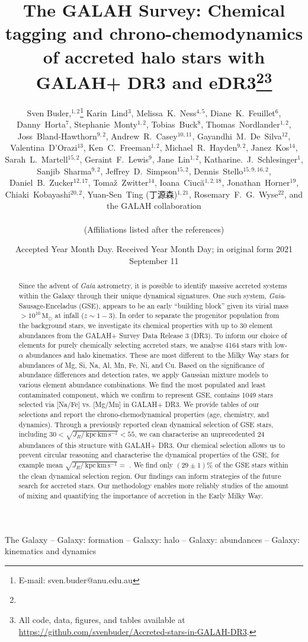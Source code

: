 \documentclass[fleqn,usenatbib]{mnras}
\title[Accreted stars in GALAH+ DR3]{The GALAH Survey: Chemical tagging and chrono-chemodynamics of accreted halo stars with GALAH+ DR3 and \Gaia eDR3\thanks{\added{GALAH+ combines observations based on the main GALAH proposals as well as K2-HERMES, TESS-HERMES, and partner proposals.}}\thanks{All code, data, figures, and tables available at \url{https://github.com/svenbuder/Accreted-stars-in-GALAH-DR3}.}}
\author[S. Buder et al.]{Sven Buder,$^{1,2}$\thanks{E-mail: sven.buder@anu.edu.au}
Karin~Lind$^{3}$, 
Melissa~K.~Ness$^{4,5}$, 
Diane~K.~Feuillet$^{6}$,
Danny~Horta$^{7}$,
Stephanie~Monty$^{1,2}$, \newauthor
Tobias~Buck$^{8}$, 
Thomas~Nordlander$^{1,2}$,
Joss~Bland-Hawthorn$^{9,2}$,
Andrew~R.~Casey$^{10,11}$,\newauthor
Gayandhi~M.~De~Silva$^{12}$,
Valentina~{D'Orazi}$^{13}$,
Ken~C.~Freeman$^{1,2}$, 
Michael~R.~Hayden$^{9,2}$,
Janez~Kos$^{14}$, \newauthor
Sarah~L.~Martell$^{15,2}$, 
Geraint~F.~Lewis$^{9}$,
Jane~Lin$^{1,2}$, 
Katharine.~J.~Schlesinger$^{1}$, 
Sanjib~Sharma$^{9,2}$, \newauthor
Jeffrey~D.~Simpson$^{15,2}$, 
Dennis~Stello$^{15,9,16,2}$,
Daniel~B.~Zucker$^{12,17}$, 
Toma\v{z}~Zwitter$^{14}$,
Ioana~Ciuc\u{a}$^{1,2,18}$,\newauthor
Jonathan~Horner$^{19}$,
Chiaki~Kobayashi$^{20,2}$,
Yuan-Sen~Ting (丁源森)$^{1,21}$,
Rosemary~F.~G.~Wyse$^{22}$, \newauthor
and the GALAH collaboration
\\
\\
(Affiliations listed after the references)}
\date{Accepted Year Month Day. Received Year Month Day; in original form 2021 September 11}
\newcommand{\added}[1]{#1}
\newcommand{\Msol}{\,\mathrm{M_\odot}} %
\newcommand{\kpckms}{\,\mathrm{kpc\,km\,s^{-1}}}	%
\newcommand{\Gaia}{\textit{Gaia}\xspace} %
\begin{document}
\begin{CJK*}{UTF8}{gbsn}
\label{firstpage}
\pagerange{\pageref{firstpage}--\pageref{lastpage}}
\maketitle
\end{CJK*}

\begin{abstract}
Since the advent of \Gaia astrometry, it is possible to identify massive accreted systems within the Galaxy through their unique dynamical signatures. One such system, \Gaia-Sausage-Enceladus (GSE), appears to be an early ``building block'' given its virial mass $> 10^{10}\Msol$ at infall ($z\sim 1-3$). In order to separate the progenitor population from the background stars, we investigate its chemical properties with up to 30 element abundances from the GALAH+ Survey Data Release 3 (DR3). To inform our choice of elements for purely chemically selecting accreted stars, we analyse 4164 stars with low-$\alpha$ abundances and halo kinematics. These are most different to the Milky Way stars for abundances of Mg, Si, Na, Al, Mn, Fe, Ni, and Cu. Based on the significance of abundance differences and detection rates, we apply Gaussian mixture models to various element abundance combinations. We find the most populated and least contaminated component, which we confirm to represent GSE, contains 1049 stars selected via [Na/Fe] vs. [Mg/Mn] in GALAH+ DR3. We provide tables of our selections and report the chrono-chemodynamical properties (age, chemistry, and dynamics). Through a previously reported clean dynamical selection of GSE stars, including $30 < \sqrt{J_R / \kpckms} < 55$, we can characterise an unprecedented 24 abundances of this structure with GALAH+ DR3. Our chemical selection allows us to prevent circular reasoning and characterise the dynamical properties of the GSE, for example mean $\sqrt{J_R / \kpckms} = $ . We find only $(29\pm1)\%$ of the GSE stars within the clean dynamical selection region. \added{Our findings can inform strategies of the future search for accreted stars. Our methodology enables more reliably studies of the amount of mixing and quantifying the importance of accretion in the Early Milky Way.} \href{https://github.com/svenbuder/Accreted-stars-in-GALAH-DR3}{\faGithub}
\end{abstract}

\begin{keywords}
The Galaxy -- Galaxy: formation -- Galaxy: halo -- Galaxy: abundances -- Galaxy: kinematics and dynamics
\end{keywords}
\end{document}
